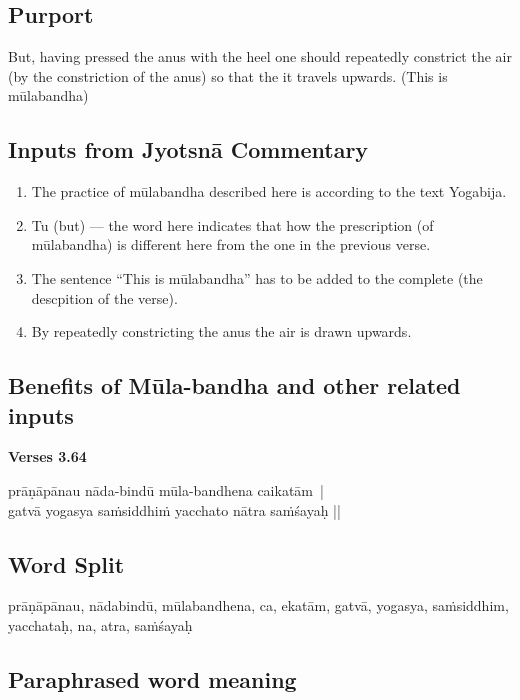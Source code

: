 \subsection*{Purport}

But, having pressed the anus with the heel one should repeatedly constrict the air (by the constriction of the anus) so that the it travels upwards. (This is mūlabandha)  

\subsection*{Inputs from Jyotsnā Commentary}

\begin{enumerate}
\item The practice of mūlabandha described here is according to the text Yogabija.
\item Tu (but) --- the word here indicates that how the prescription (of mūlabandha) is different here from the one in the previous verse.
\item The sentence “This is mūlabandha” has to be added to the complete (the descpition of the verse).
\item By repeatedly constricting the anus the air is drawn upwards.
\end{enumerate}

\subsection*{Benefits of Mūla-bandha and other related inputs}

\noindent \textbf{Verses 3.64}

\begin{shloka}
prāṇāpānau nāda-bindū mūla-bandhena caikatām |\\
gatvā yogasya saṁsiddhiṁ yacchato nātra saṁśayaḥ ||
\end{shloka}

\subsection*{Word Split}

prāṇāpānau, nādabindū, mūlabandhena, ca, ekatām, gatvā, yogasya, saṁsiddhim, yacchataḥ, na, atra, saṁśayaḥ 

\subsection*{Paraphrased word meaning}

